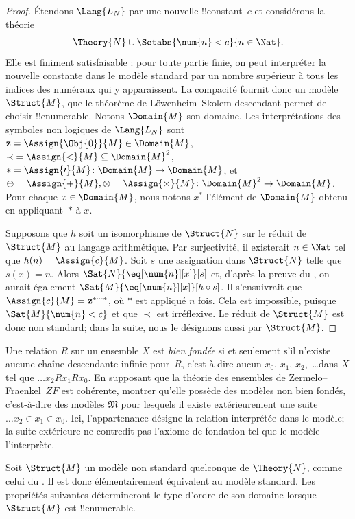 \documentclass[../../../include/open-logic-section]{subfiles}
\begin{document}
\begin{proof}
Étendons $\Lang{L_N}$ par une nouvelle !!{constant}~$c$ et considérons
la théorie
\[
\Theory{N} \cup \Setabs{\num{n} < c}{n \in \Nat}.
\]
Elle est finiment satisfaisable : pour toute partie finie, on peut
interpréter la nouvelle constante dans le modèle standard par un
nombre supérieur à tous les indices des numéraux qui y apparaissent.
La compacité fournit donc un modèle $\Struct{M}$, que le théorème
de Löwenheim--Skolem descendant permet de choisir !!{enumerable}.
Notons $\Domain{M}$ son domaine. Les interprétations des symboles
non logiques de $\Lang{L_N}$ sont
$\mathbf{z} = \Assign{\Obj{0}}{M} \in \Domain{M}$,
$ {\prec} = \Assign{<}{M} \subseteq \Domain{M}^2$,
$* = \Assign{\prime}{M} \colon \Domain{M} \to \Domain{M}$,
et $\oplus = \Assign{+}{M}, \otimes = \Assign{\times}{M} \colon
\Domain{M}^2 \to \Domain{M}$.
Pour chaque $x \in \Domain{M}$, nous notons $x^*$ l'élément de
$\Domain{M}$ obtenu en appliquant~$*$ à $x$.

Supposons que $h$ soit un isomorphisme de $\Struct{N}$ sur le réduit
de $\Struct{M}$ au langage arithmétique. Par surjectivité, il existerait
$n \in \Nat$ tel que $h(n) = \Assign{c}{M}$. Soit $s$ une assignation
dans $\Struct{N}$ telle que $s(x) = n$. Alors
$\Sat{N}{\eq[\num{n}][x]}[s]$ et, d'après la preuve du
, on aurait également
$\Sat{M}{\eq[\num{n}][x]}[h \circ s]$.
Il s'ensuivrait que
$\Assign{c}{M} = \mathbf{z}^{*\cdots *}$, où $*$ est appliqué $n$ fois.
Cela est impossible, puisque $\Sat{M}{\num{n} < c}$ et que $\prec$
est irréflexive. Le réduit de $\Struct{M}$ est donc non standard;
dans la suite, nous le désignons aussi par $\Struct{M}$.
\end{proof}

\begin{prob}
Une relation $R$ sur un ensemble $X$ est \emph{bien fondée} si et
seulement s'il n'existe aucune chaîne descendante infinie pour~$R$,
c'est-à-dire aucun $x_0$, $x_1$, $x_2$,~\dots dans $X$ tel que
$\dots x_2Rx_1Rx_0$.
En supposant que la théorie des ensembles de Zermelo--Fraenkel~$ZF$
est cohérente, montrer qu'elle possède des modèles non bien fondés,
c'est-à-dire des modèles $\mathfrak{M}$ pour lesquels il existe
extérieurement une suite $\dots x_2 \in x_1 \in x_0$.
Ici, l'appartenance désigne la relation interprétée dans le modèle;
la suite extérieure ne contredit pas l'axiome de fondation tel
que le modèle l'interprète.
\end{prob}

Soit $\Struct{M}$ un modèle non standard quelconque de
$\Theory{N}$, comme celui du . Il est
donc élémentairement équivalent au modèle standard. Les propriétés
suivantes détermineront le type d'ordre de son domaine lorsque
$\Struct{M}$ est !!{enumerable}.
\end{document}
